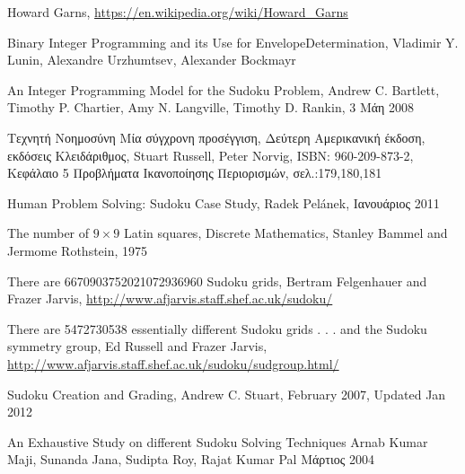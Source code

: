 \documentclass[oneside,12pt]{book}
\theoremstyle{definition}
\begin{document}
\begin{thebibliography}{depth}
	Howard Garns,
	\url{https://en.wikipedia.org/wiki/Howard_Garns}

	Binary Integer Programming and its Use for EnvelopeDetermination,
	Vladimir Y. Lunin, Alexandre Urzhumtsev, Alexander Bockmayr

	An Integer Programming Model for the Sudoku Problem,
	Andrew C. Bartlett,	Timothy P. Chartier, Amy N. Langville, Timothy D. Rankin,
	3 Μάη 2008

	Τεχνητή Νοημοσύνη Μία σύγχρονη προσέγγιση, Δεύτερη Αμερικανική έκδοση, εκδόσεις Κλειδάριθμος,
	Stuart Russell, Peter Norvig,
	ISBN: 960-209-873-2,
	Κεφάλαιο 5 Προβλήματα Ικανοποίησης Περιορισμών, σελ.:179,180,181

	Human Problem Solving: Sudoku Case Study,
	Radek Pelánek,
	Ιανουάριος 2011

	The number of \(9 \times 9\) Latin squares, Discrete Mathematics,
	Stanley Bammel and Jermome Rothstein,
	1975

	There are 6670903752021072936960 Sudoku grids,
	Bertram Felgenhauer and Frazer Jarvis,
	\url{ http://www.afjarvis.staff.shef.ac.uk/sudoku/}

	There are 5472730538 essentially different Sudoku grids . . . and the
	Sudoku symmetry group,
	Ed Russell and Frazer Jarvis,
	\url{ http://www.afjarvis.staff.shef.ac.uk/sudoku/sudgroup.html/}

	Sudoku Creation and Grading,
	Andrew C. Stuart,
	February 2007, Updated Jan 2012

	An Exhaustive Study on different Sudoku Solving
Techniques
	Arnab Kumar Maji, Sunanda Jana, Sudipta Roy, Rajat Kumar Pal
	Μάρτιος 2004

\end{thebibliography}
\end{document}

